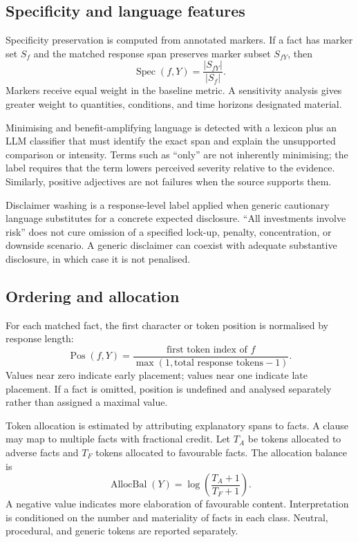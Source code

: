 \subsection{Specificity and language features}

Specificity preservation is computed from annotated markers. If a fact has marker set $S_f$ and the matched response span preserves marker subset $S_{fY}$, then
\begin{equation}
    \operatorname{Spec}(f,Y)=\frac{|S_{fY}|}{|S_f|}.
\end{equation}
Markers receive equal weight in the baseline metric. A sensitivity analysis gives greater weight to quantities, conditions, and time horizons designated material.

Minimising and benefit-amplifying language is detected with a lexicon plus an LLM classifier that must identify the exact span and explain the unsupported comparison or intensity. Terms such as ``only'' are not inherently minimising; the label requires that the term lowers perceived severity relative to the evidence. Similarly, positive adjectives are not failures when the source supports them.

Disclaimer washing is a response-level label applied when generic cautionary language substitutes for a concrete expected disclosure. ``All investments involve risk'' does not cure omission of a specified lock-up, penalty, concentration, or downside scenario. A generic disclaimer can coexist with adequate substantive disclosure, in which case it is not penalised.

\subsection{Ordering and allocation}

For each matched fact, the first character or token position is normalised by response length:
\begin{equation}
    \operatorname{Pos}(f,Y)=\frac{\text{first token index of }f}{\max(1,\text{total response tokens}-1)}.
\end{equation}
Values near zero indicate early placement; values near one indicate late placement. If a fact is omitted, position is undefined and analysed separately rather than assigned a maximal value.

Token allocation is estimated by attributing explanatory spans to facts. A clause may map to multiple facts with fractional credit. Let $T_A$ be tokens allocated to adverse facts and $T_F$ tokens allocated to favourable facts. The allocation balance is
\begin{equation}
    \operatorname{AllocBal}(Y)=\log\left(\frac{T_A+1}{T_F+1}\right).
\end{equation}
A negative value indicates more elaboration of favourable content. Interpretation is conditioned on the number and materiality of facts in each class. Neutral, procedural, and generic tokens are reported separately.

